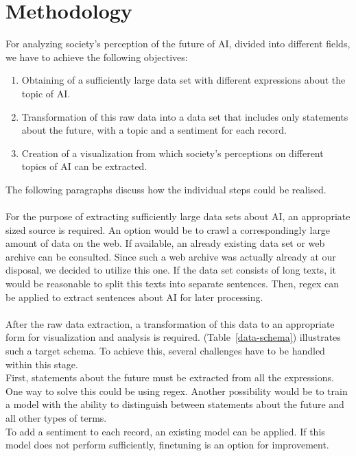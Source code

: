 \section{Methodology}

For analyzing society's perception of the future of AI, divided into different fields, we have to achieve the following objectives:

\begin{enumerate}
    \item Obtaining of a sufficiently large data set with different expressions about the topic of AI.
    \item Transformation of this raw data into a data set that includes only statements about the future, with a topic and a sentiment for each record.
    \item Creation of a visualization from which society's perceptions on different topics of AI can be extracted.
\end{enumerate}%
%
The following paragraphs discuss how the individual steps could be realised.
\\
\\
For the purpose of extracting sufficiently large data sets about AI, an appropriate sized source is required.
An option would be to crawl a correspondingly large amount of data on the web.
If available, an already existing data set or web archive can be consulted.
Since such a web archive was actually already at our disposal, we decided to utilize this one.
If the data set consists of long texts, it would be reasonable to split this texts into separate sentences.
Then, regex can be applied to extract sentences about AI for later processing.
\\
\\
After the raw data extraction, a transformation of this data to an appropriate form for visualization and analysis is required.
(Table~\ref{data-schema}) illustrates such a target schema.
To achieve this, several challenges have to be handled within this stage.
\\
First, statements about the future must be extracted from all the expressions.
One way to solve this could be using regex.
Another possibility would be to train a model with the ability to distinguish between statements about the future and all other types of terms.\\
To add a sentiment to each record, an existing model can be applied.
If this model does not perform sufficiently, finetuning is an option for improvement.
\\
